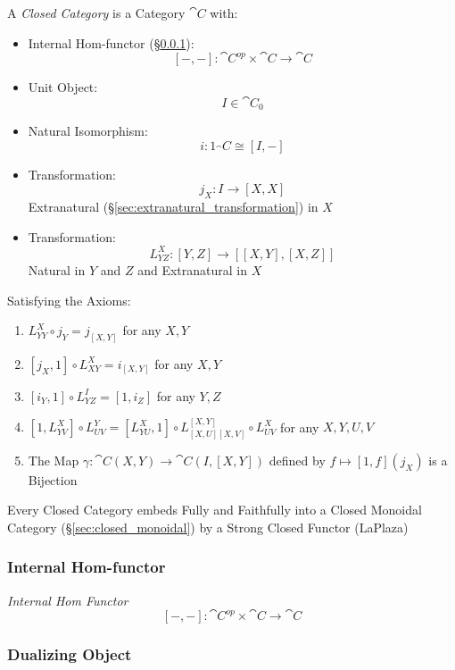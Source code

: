 A \emph{Closed Category} is a Category $\cat{C}$ with:
\begin{itemize}
  \item Internal Hom-functor (\S\ref{sec:internal_hom}):
    \[
      [-,-]:\cat{C}^{op} \times \cat{C} \rightarrow \cat{C}
    \]
  \item Unit Object:
    \[
      I \in \cat{C}_0
    \]
  \item Natural Isomorphism:
    \[
      i : 1_\cat{C} \cong [I,-]
    \]
  \item Transformation:
    \[
      j_X : I \rightarrow [X,X]
    \]
    Extranatural (\S\ref{sec:extranatural_transformation}) in $X$
  \item Transformation:
    \[
      L_{Y Z}^X : [Y,Z] \rightarrow [[X,Y],[X,Z]]
    \]
    Natural in $Y$ and $Z$ and Extranatural in $X$
\end{itemize}
Satisfying the Axioms:
\begin{enumerate}
  \item $L_{Y Y}^X \circ j_Y = j_{[X,Y]}$ for any $X,Y$
  \item $[j_X,1] \circ L_{X Y}^X = i_{[X,Y]}$ for any $X,Y$
  \item $[i_Y,1] \circ L_{Y Z}^I = [1,i_Z]$ for any $Y,Z$
  \item $[1,L_{Y V}^X] \circ L_{U V}^Y = [L_{Y U}^X,1] \circ L_{[X,U]
    [X,V]}^{[X,Y]} \circ L_{U V}^X$ for any $X,Y,U,V$
  \item The Map $\gamma : \cat{C}(X,Y) \rightarrow \cat{C}(I,[X,Y])$
    defined by $f \mapsto [1,f](j_X)$ is a Bijection
\end{enumerate}

Every Closed Category embeds Fully and Faithfully into a Closed
Monoidal Category (\S\ref{sec:closed_monoidal}) by a Strong Closed
Functor (LaPlaza) %



\subsubsection{Internal Hom-functor}\label{sec:internal_hom}

\emph{Internal Hom Functor}
\[
  [-,-] : \cat{C}^{op} \times \cat{C} \rightarrow \cat{C}
\]



\subsubsection{Dualizing Object}\label{sec:dualizing_object}

